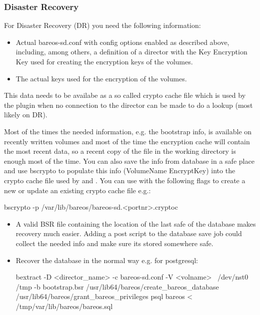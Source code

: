 \subsubsection{Disaster Recovery}

For Disaster Recovery (DR) you need the following information:

\begin{itemize}
 \item Actual bareos-sd.conf with config options enabled as described above, including, among others, a definition of a director with the Key Encryption Key used for creating the encryption keys of the volumes.
 \item The actual keys used for the encryption of the volumes.
\end{itemize}

This data needs to be availabe as a so called crypto cache file which is used by the plugin when no connection to the director can be made to do a lookup (most likely on DR).

Most of the times the needed information, e.g. the bootstrap info, is available on recently written volumes and most of the time the encryption cache will contain the most recent data, so a recent copy of the  file in the working directory is enough most of the time. You can also save the info from database in a safe place and use bscrypto to populate this info 
(VolumeName \textrightarrow EncryptKey) into the crypto cache file used by  and .
You can use  with the following flags to create a new or update an existing crypto cache file e.g.:

\begin{commands}{}
bscrypto -p /var/lib/bareos/bareos-sd.<portnr>.cryptoc
\end{commands}

\begin{itemize}
 \item A valid BSR file containing the location of the last safe of the database makes recovery much easier. Adding a post script to the database save job could collect the needed info and make sure its stored somewhere safe.
 \item Recover the database in the normal way e.g. for postgresql:
\begin{commands}{}
bextract -D <director_name> -c bareos-sd.conf -V <volname> \ /dev/nst0 /tmp -b bootstrap.bsr
/usr/lib64/bareos/create_bareos_database
/usr/lib64/bareos/grant_bareos_privileges
psql bareos < /tmp/var/lib/bareos/bareos.sql
\end{commands}
\end{itemize}

